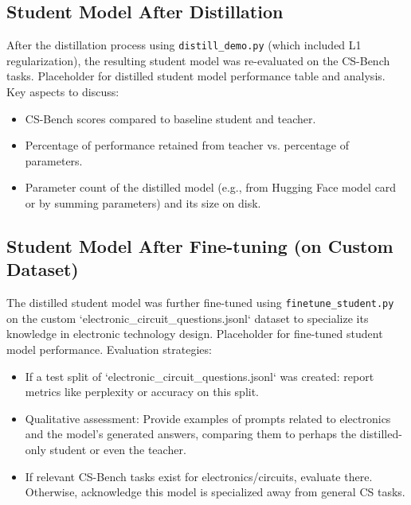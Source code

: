 \documentclass[12pt, a4paper]{report}
\begin{document}
\subsection{Student Model After Distillation}
\label{ssec:student_after_distillation}
After the distillation process using \texttt{distill\_demo.py} (which included L1 regularization), the resulting student model was re-evaluated on the CS-Bench tasks.
\noindent Placeholder for distilled student model performance table and analysis. Key aspects to discuss:
\begin{itemize}
    \item CS-Bench scores compared to baseline student and teacher.
    \item Percentage of performance retained from teacher vs. percentage of parameters.
    \item Parameter count of the distilled model (e.g., from Hugging Face model card or by summing parameters) and its size on disk.
\end{itemize}

\subsection{Student Model After Fine-tuning (on Custom Dataset)}
\label{ssec:student_after_finetuning}
The distilled student model was further fine-tuned using \texttt{finetune\_student.py} on the custom `electronic_circuit_questions.jsonl` dataset to specialize its knowledge in electronic technology design.
\noindent Placeholder for fine-tuned student model performance. Evaluation strategies:
\begin{itemize}
    \item If a test split of `electronic_circuit_questions.jsonl` was created: report metrics like perplexity or accuracy on this split.
    \item Qualitative assessment: Provide examples of prompts related to electronics and the model's generated answers, comparing them to perhaps the distilled-only student or even the teacher.
    \item If relevant CS-Bench tasks exist for electronics/circuits, evaluate there. Otherwise, acknowledge this model is specialized away from general CS tasks.
\end{itemize}
\end{document}
